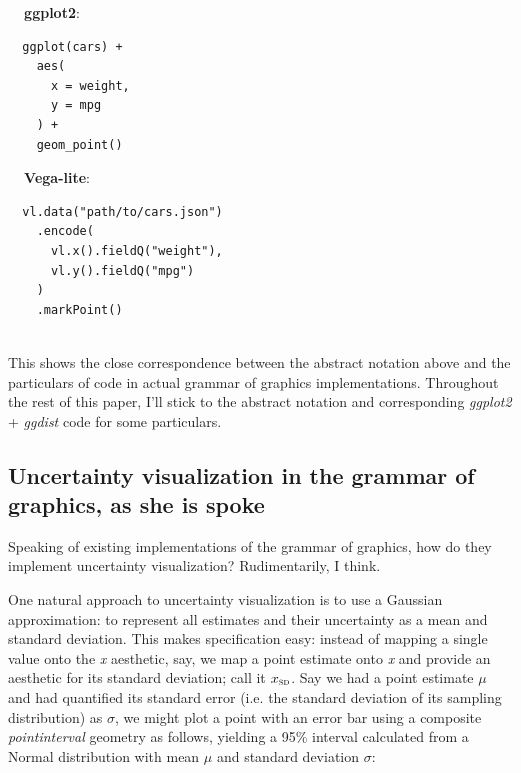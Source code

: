 \documentclass[journal]{vgtc}                     %
\begin{document}
\vspace{5pt}
\noindent
\begin{minipage}{.4\columnwidth}%
\textbf{~~ggplot2}:

\small
\vspace{-8pt}
\begin{verbatim}
  ggplot(cars) +
    aes(
      x = weight,
      y = mpg
    ) +
    geom_point()
\end{verbatim}%
\end{minipage}%
\begin{minipage}{.5\columnwidth}%
\textbf{~~Vega-lite}:

\small
\vspace{-8pt}
\begin{verbatim}
  vl.data("path/to/cars.json")
    .encode(
      vl.x().fieldQ("weight"),
      vl.y().fieldQ("mpg")
    )
    .markPoint()
\end{verbatim}%
\end{minipage}%
\vspace{.6\belowdisplayskip}\\
This shows the close correspondence between the abstract notation above and the particulars of code in actual grammar of graphics implementations. Throughout the rest of this paper, I'll stick to the abstract notation and corresponding \textit{ggplot2} + \textit{ggdist} code for some particulars.

\subsection{Uncertainty visualization in the grammar of graphics, as she is spoke}

Speaking of existing implementations of the grammar of graphics, how do they implement uncertainty visualization? Rudimentarily, I think.

One natural approach to uncertainty visualization is to use a Gaussian approximation: to represent all estimates and their uncertainty as a mean and standard deviation. This makes specification easy: instead of mapping a single value onto the \textit{x} aesthetic, say, we map a point estimate onto \textit{x} and provide an aesthetic for its standard deviation; call it $x_\textsc{sd}$. Say we had a point estimate $\mu$ and had quantified its standard error (i.e. the standard deviation of its sampling distribution) as $\sigma$, we might plot a point with an error bar using a composite \textit{pointinterval} geometry as follows, yielding a 95\% interval calculated from a Normal distribution with mean $\mu$ and standard deviation $\sigma$:
\end{document}
